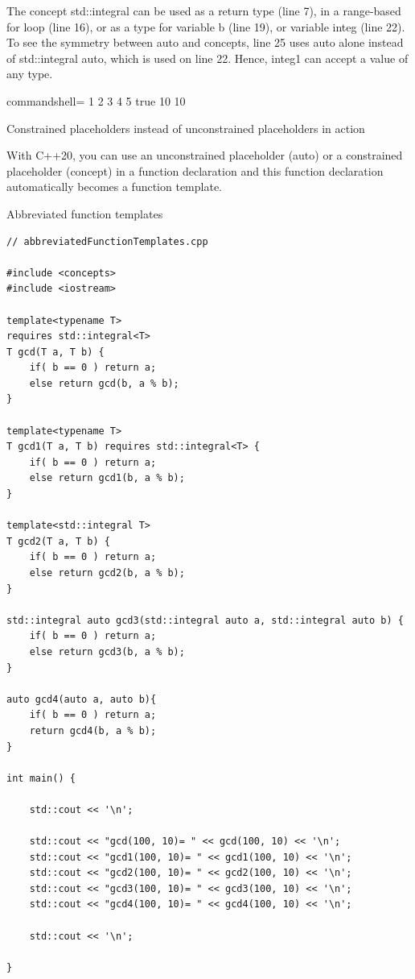 The concept std::integral can be used as a return type (line 7), in a range-based for loop (line 16), or as a type for variable b (line 19), or variable integ (line 22). To see the symmetry between auto and concepts, line 25 uses auto alone instead of std::integral auto, which is used on line 22. Hence, integ1 can accept a value of any type.

\begin{tcblisting}{commandshell={}}
1 2 3 4 5
true
10
10
\end{tcblisting}

\begin{center}
Constrained placeholders instead of unconstrained placeholders in action
\end{center}


With C++20, you can use an unconstrained placeholder (auto) or a constrained placeholder (concept) in a function declaration and this function declaration automatically becomes a function template.

\noindent
Abbreviated function templates
\begin{lstlisting}[style=styleCXX]
// abbreviatedFunctionTemplates.cpp

#include <concepts>
#include <iostream>

template<typename T>
requires std::integral<T>
T gcd(T a, T b) {
	if( b == 0 ) return a;
	else return gcd(b, a % b);
}

template<typename T>
T gcd1(T a, T b) requires std::integral<T> {
	if( b == 0 ) return a;
	else return gcd1(b, a % b);
}

template<std::integral T>
T gcd2(T a, T b) {
	if( b == 0 ) return a;
	else return gcd2(b, a % b);
}

std::integral auto gcd3(std::integral auto a, std::integral auto b) {
	if( b == 0 ) return a;
	else return gcd3(b, a % b);
}

auto gcd4(auto a, auto b){
	if( b == 0 ) return a;
	return gcd4(b, a % b);
}

int main() {

	std::cout << '\n';
	
	std::cout << "gcd(100, 10)= " << gcd(100, 10) << '\n';
	std::cout << "gcd1(100, 10)= " << gcd1(100, 10) << '\n';
	std::cout << "gcd2(100, 10)= " << gcd2(100, 10) << '\n';
	std::cout << "gcd3(100, 10)= " << gcd3(100, 10) << '\n';
	std::cout << "gcd4(100, 10)= " << gcd4(100, 10) << '\n';
	
	std::cout << '\n';

}
\end{lstlisting}

